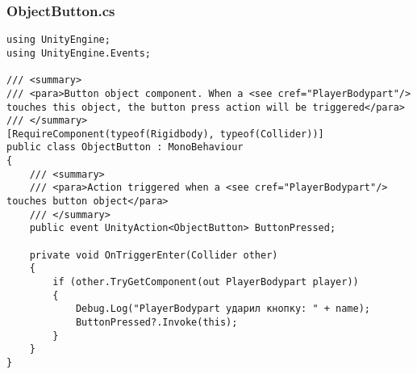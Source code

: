 \subsubsection*{ObjectButton.cs}
\begin{verbatim}
using UnityEngine;
using UnityEngine.Events;

/// <summary>
/// <para>Button object component. When a <see cref="PlayerBodypart"/> touches this object, the button press action will be triggered</para>
/// </summary>
[RequireComponent(typeof(Rigidbody), typeof(Collider))]
public class ObjectButton : MonoBehaviour
{
    /// <summary>
    /// <para>Action triggered when a <see cref="PlayerBodypart"/> touches button object</para>
    /// </summary>
    public event UnityAction<ObjectButton> ButtonPressed;

    private void OnTriggerEnter(Collider other)
    {
        if (other.TryGetComponent(out PlayerBodypart player))
        {
            Debug.Log("PlayerBodypart ударил кнопку: " + name);
            ButtonPressed?.Invoke(this);
        }
    }
}
\end{verbatim}
